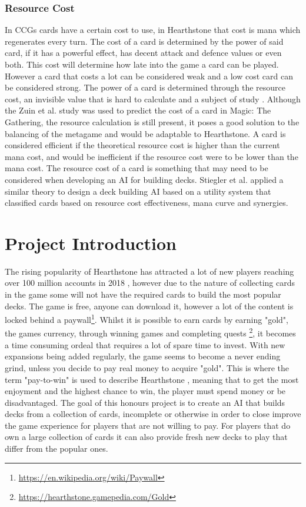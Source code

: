 \documentclass{report}
\begin{document}
\subsubsection{Resource Cost}
	In CCGs cards have a certain cost to use, in Hearthstone that cost is mana which regenerates every turn. The cost of a card is determined by the power of said card, if it has a powerful effect, has decent attack and defence values or even both. This cost will determine how late into the game a card can be played. However a card that costs a lot can be considered weak and a low cost card can be considered strong. The power of a card is determined through the resource cost, an invisible value that is hard to calculate and a subject of study \cite{Zuin2019}. Although the Zuin et al. study was used to predict the cost of a card in Magic: The Gathering, the resource calculation is still present, it poses a good solution to the balancing of the metagame and would be adaptable to Hearthstone. A card is considered efficient if the theoretical resource cost is higher than the current mana cost, and would be inefficient if the resource cost were to be lower than the mana cost. The resource cost of a card is something that may need to be considered when developing an AI for building decks. Stiegler et al. \cite{Stiegler2017} applied a similar theory to design a deck building AI based on a utility system that classified cards based on resource cost effectiveness, mana curve and synergies.
\section{Project Introduction}
	 The rising popularity of Hearthstone has attracted a lot of new players reaching over 100 million accounts in 2018 \cite{100mil}, however due to the nature of collecting cards in the game some will not have the required cards to build the most popular decks. The game is free, anyone can download it, however a lot of the content is locked behind a paywall\footnote{\url{https://en.wikipedia.org/wiki/Paywall}}. Whilst it is possible to earn cards by earning "gold", the games currency, through winning games and completing quests \footnote{\url{https://hearthstone.gamepedia.com/Gold}}, it becomes a time consuming ordeal that requires a lot of spare time to invest. With new expansions being added regularly, the game seems to become a never ending grind, unless you decide to pay real money to acquire "gold". This is where the term "pay-to-win" is used to describe Hearthstone \cite{Howard2019}, meaning that to get the most enjoyment and the highest chance to win, the player must spend money or be disadvantaged. The goal of this honours project is to create an AI that builds decks from a  collection of cards, incomplete or otherwise in order to close improve the game experience for players that are not willing to pay. For players that do own a large collection of cards it can also provide fresh new decks to play that differ from the popular ones.
\end{document}
